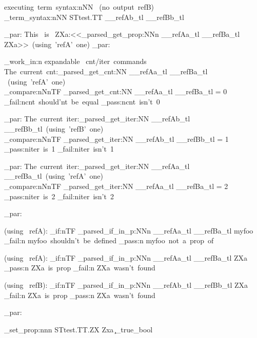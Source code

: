 \documentclass{article}
\begin{document}
executing~term~syntax:nNN ~(no~output~refB)\\
\starray_term_syntax:nNN {STtest.TT} \__refAb_tl \__refBb_tl


\sttests_par:
This~ is~ ZXa:<<\starray_parsed_get_prop:NNn \__refAa_tl \__refBa_tl {ZXa}>>~(using~'refA'~one)
\sttests_par:

\sttests_work_in:n {expandable~ cnt/iter~commands}
The~current~cnt:\starray_parsed_get_cnt:NN \__refAa_tl \__refBa_tl ~(using~'refA'~one)\\

\int_compare:nNnTF {\starray_parsed_get_cnt:NN \__refAa_tl \__refBa_tl} = {0}
  {\sttests_fail:n{cnt~should'nt~be~equal}} 
  {\sttests_pass:n{cnt~isn't~0}}
  
\sttests_par:
The~current~iter:\starray_parsed_get_iter:NN \__refAb_tl \__refBb_tl~(using~'refB'~one)\\

\int_compare:nNnTF {\starray_parsed_get_iter:NN \__refAb_tl \__refBb_tl} = {1}
  {\sttests_pass:n{iter~is~1}} 
  {\sttests_fail:n{iter~isn't~1}}

\sttests_par:
The~current~iter:\starray_parsed_get_iter:NN \__refAa_tl \__refBa_tl~(using~'refA'~one)\\

\int_compare:nNnTF {\starray_parsed_get_iter:NN \__refAa_tl \__refBa_tl} = {2}
  {\sttests_pass:n{iter~is~2}} 
  {\sttests_fail:n{iter~isn't~2}}


\sttests_par:

(using~ refA):
\bool_if:nTF { \starray_parsed_if_in_p:NNn \__refAa_tl \__refBa_tl {myfoo} }
  {  \sttests_fail:n {myfoo~shouldn't~be~defined } }
  {   \sttests_pass:n {myfoo~not~a~prop~of } }

(using~ refA):
\bool_if:nTF { \starray_parsed_if_in_p:NNn \__refAa_tl \__refBa_tl {ZXa} }
  {  \sttests_pass:n {ZXa~is~prop } }
  {   \sttests_fail:n {ZXa~wasn't~found } }

(using~ refB):
\bool_if:nTF { \starray_parsed_if_in_p:NNn \__refAb_tl \__refBb_tl {ZXa} }
  {  \sttests_fail:n {ZXa~is~prop } }
  {   \sttests_pass:n {ZXa~wasn't~found } }




\sttests_par:


  
\starray_set_prop:nnn {STtest.TT.ZX}  {Zxa} {\c_true_bool}
\end{document}
